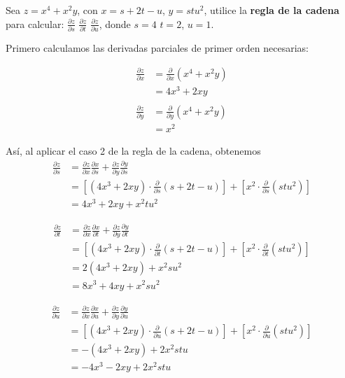 \documentclass[12pt]{article}
\begin{document}
\section{}

Sea $z = x^4 + x^2y$, con $x = s + 2t - u$, $y = stu^2$, utilice la \textbf{regla de la cadena} para calcular: $\frac{\partial z}{\partial s}$ $\frac{\partial z}{\partial t}$ $\frac{\partial z}{\partial u}$, donde $s=4$ $t=2$, $u=1$.

Primero calculamos las derivadas parciales de primer orden necesarias:

\begin{align*}
  \frac{\partial z}{\partial x}
  &= \frac{\partial}{\partial x}(x^4 + x^2y) \\
  &= 4x^3+2xy \\ \\
  \frac{\partial z}{\partial y}
  &= \frac{\partial}{\partial y}(x^4 + x^2y) \\
  &= x^2 
\end{align*}

Así, al aplicar el caso 2 de la regla de la cadena, obtenemos
\begin{align*}
  \frac{\partial z}{\partial s}
  &= \frac{\partial z}{\partial x}\frac{\partial x}{\partial s} + \frac{\partial z}{\partial y}\frac{\partial y}{\partial s} \\
  &= \left[(4x^3+2xy)\cdot \frac{\partial}{\partial s}(s + 2t - u)\right] +
  \left[x^2 \cdot \frac{\partial}{\partial s}(stu^2)\right] \\
  &= 4x^3+2xy + x^2tu^2
\end{align*}

\begin{align*}
  \frac{\partial z}{\partial t}
  &= \frac{\partial z}{\partial x}\frac{\partial x}{\partial t} + \frac{\partial z}{\partial y}\frac{\partial y}{\partial t} \\
  &= \left[(4x^3+2xy)\cdot \frac{\partial}{\partial t}(s + 2t - u)\right] +
  \left[x^2 \cdot \frac{\partial}{\partial t}(stu^2)\right] \\
  &= 2(4x^3+2xy) + x^2su^2 \\
  &= 8x^3 + 4xy + x^2su^2
\end{align*}

\begin{align*}
  \frac{\partial z}{\partial u}
  &= \frac{\partial z}{\partial x}\frac{\partial x}{\partial u} + \frac{\partial z}{\partial y}\frac{\partial y}{\partial u} \\
  &= \left[(4x^3+2xy)\cdot \frac{\partial}{\partial u}(s + 2t - u)\right] +
  \left[x^2 \cdot \frac{\partial}{\partial u}(stu^2)\right] \\
  &= -(4x^3+2xy) + 2x^2stu \\
  &= -4x^3 - 2xy + 2x^2stu
\end{align*}
\end{document}

